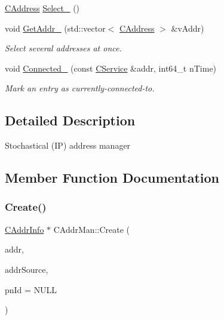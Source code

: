 \begin{DoxyCompactItemize}
\mbox{\hyperlink{class_c_address}{C\+Address}} \mbox{\hyperlink{class_c_addr_man_af34f24d32505ff3590cbacbc4cc4c09e}{Select\+\_\+}} ()
\item 
\mbox{\label{class_c_addr_man_aff86d04dc7c0e0afae3ff5998417db17}} 
void \mbox{\hyperlink{class_c_addr_man_aff86d04dc7c0e0afae3ff5998417db17}{Get\+Addr\+\_\+}} (std\+::vector$<$ \mbox{\hyperlink{class_c_address}{C\+Address}} $>$ \&v\+Addr)
\begin{DoxyCompactList}\small\item\em Select several addresses at once. \end{DoxyCompactList}\item 
\mbox{\label{class_c_addr_man_a1ae72643c51293f3f3345e74ce0368ca}} 
void \mbox{\hyperlink{class_c_addr_man_a1ae72643c51293f3f3345e74ce0368ca}{Connected\+\_\+}} (const \mbox{\hyperlink{class_c_service}{C\+Service}} \&addr, int64\+\_\+t n\+Time)
\begin{DoxyCompactList}\small\item\em Mark an entry as currently-\/connected-\/to. \end{DoxyCompactList}\end{DoxyCompactItemize}


\subsection{Detailed Description}
Stochastical (IP) address manager 

\subsection{Member Function Documentation}
\mbox{\label{class_c_addr_man_aac93f51c0580e38a950a0f63b053bedb}} 
\subsubsection{\texorpdfstring{Create()}{Create()}}
{\footnotesize\ttfamily \mbox{\hyperlink{class_c_addr_info}{C\+Addr\+Info}} $\ast$ C\+Addr\+Man\+::\+Create (\begin{DoxyParamCaption}\item[{const \mbox{\hyperlink{class_c_address}{C\+Address}} \&}]{addr,  }\item[{const \mbox{\hyperlink{class_c_net_addr}{C\+Net\+Addr}} \&}]{addr\+Source,  }\item[{int $\ast$}]{pn\+Id = {\ttfamily NULL} }\end{DoxyParamCaption})\hspace{0.3cm}{\ttfamily [protected]}}

